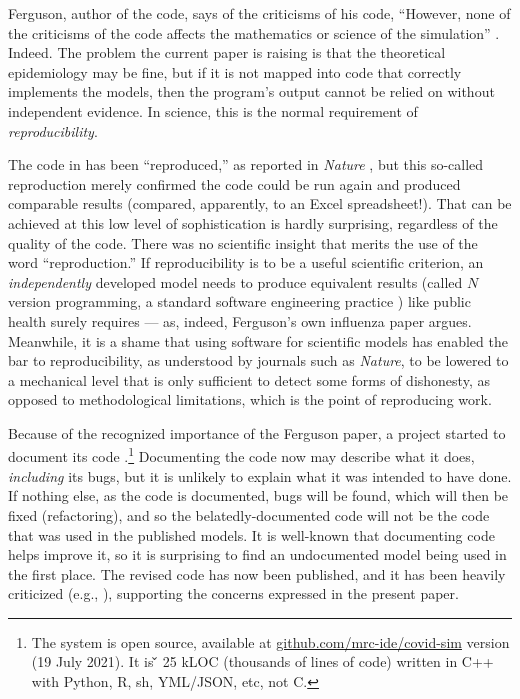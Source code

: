 \documentclass[10pt,letterpaper]{article}
\def \citeeg#1{(e.g., \cite{#1})}
\begin{document}
Ferguson, author of the code, says of the criticisms of his code, ``However, none of the criticisms of the code affects the mathematics or science of the simulation'' \cite{thumbs-up}. Indeed. The problem the current paper is raising is that the theoretical epidemiology may be fine, but if it is not mapped into code that correctly implements the models, then the program's output cannot be relied on without independent evidence. In science, this is the normal requirement of \emph{reproducibility}.

The code in \cite{nature-summary,ICmodel} has been ``reproduced,'' as reported in \emph{Nature\/} \cite{codecheck,thumbs-up}, but this so-called reproduction merely confirmed the code could be run again and produced comparable results (compared, apparently, to an Excel spreadsheet!). That can be achieved at this low level of sophistication is hardly surprising, regardless of the quality of the code. There was no scientific insight that merits the use of the word ``reproduction.'' If reproducibility is to be a useful scientific criterion, an \emph{independently\/} developed model needs to produce equivalent results (called $N$ version programming, a standard software engineering practice \cite{NVP}) like public health surely requires --- as, indeed, Ferguson's own influenza paper \cite{nvp-ferguson} argues. Meanwhile, it is a shame that using software for scientific models has enabled the bar to reproducibility, as understood by journals such as \emph{Nature}, to be lowered to a mechanical level that is only sufficient to detect some forms of dishonesty, as opposed to methodological limitations, which is the point of reproducing work.

Because of the recognized importance of the Ferguson paper, a project started to document its code  \cite{refactoring}.\footnote{The system is open source, available at \url{github.com/mrc-ide/covid-sim} version (19 July 2021). It is
\newcount\u
\newcount\v
\newcount\w
\newcount\frac
25
kLOC (thousands of lines of code) written in C++ with Python, R, sh, YML/JSON, etc, not C\@.}
Documenting the code now may describe what it does, \emph{including\/} its bugs, but it is unlikely to explain what it was intended to have done. If nothing else, as the code is documented, bugs will be found, which will then be fixed (refactoring), and so the belatedly-documented code will not be the code that was used in the published models. It is well-known that documenting code helps improve it, so it is surprising to find an undocumented model being used in the first place. The revised code has now been published, and it has been heavily criticized \citeeg{bad-code}, supporting the concerns expressed in the present paper.
\end{document}
